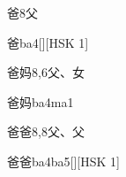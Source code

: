 \begin{entry}{爸}{8}{⽗}
  \begin{phonetics}{爸}{ba4}[][HSK 1]
  \end{phonetics}
\end{entry}

\begin{entry}{爸妈}{8,6}{⽗、⼥}
  \begin{phonetics}{爸妈}{ba4ma1}
  \end{phonetics}
\end{entry}

\begin{entry}{爸爸}{8,8}{⽗、⽗}
  \begin{phonetics}{爸爸}{ba4ba5}[][HSK 1]
  \end{phonetics}
\end{entry}


